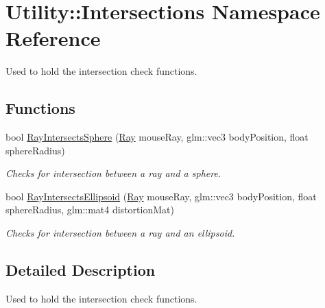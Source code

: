 \hypertarget{namespace_utility_1_1_intersections}{\section{Utility\-:\-:Intersections Namespace Reference}
\label{namespace_utility_1_1_intersections}
}


Used to hold the intersection check functions.  


\subsection*{Functions}
\begin{DoxyCompactItemize}
\item 
bool \hyperlink{namespace_utility_1_1_intersections_a0235bddb016fe1b1fefd9c2eb004ef0d}{Ray\-Intersects\-Sphere} (\hyperlink{class_utility_1_1_ray}{Ray} mouse\-Ray, glm\-::vec3 body\-Position, float sphere\-Radius)
\begin{DoxyCompactList}\small\item\em Checks for intersection between a ray and a sphere. \end{DoxyCompactList}\item 
bool \hyperlink{namespace_utility_1_1_intersections_a74e848c2fa35fc9371d2b99e8f666b2a}{Ray\-Intersects\-Ellipsoid} (\hyperlink{class_utility_1_1_ray}{Ray} mouse\-Ray, glm\-::vec3 body\-Position, float sphere\-Radius, glm\-::mat4 distortion\-Mat)
\begin{DoxyCompactList}\small\item\em Checks for intersection between a ray and an ellipsoid. \end{DoxyCompactList}\end{DoxyCompactItemize}


\subsection{Detailed Description}
Used to hold the intersection check functions. 


